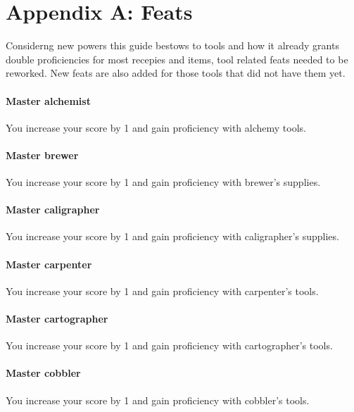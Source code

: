 \chapter*{Appendix A: Feats}

Considerng new powers this guide bestows to tools and how it already grants double proficiencies for most recepies and items, tool related feats needed to be reworked. New feats are also added for those tools that did not have them yet.

\subsubsection{Master alchemist}

You increase your \intelligence{} score by 1 and gain proficiency with alchemy tools.

\subsubsection{Master brewer}

You increase your \wisdom{} score by 1 and gain proficiency with brewer's supplies.

\subsubsection{Master caligrapher}

You increase your \intelligence{} score by 1 and gain proficiency with caligrapher's supplies.

\subsubsection{Master carpenter}

You increase your \strength{} score by 1 and gain proficiency with carpenter's tools.

\subsubsection{Master cartographer}

You increase your \intelligence{} score by 1 and gain proficiency with cartographer's tools.

\subsubsection{Master cobbler}

You increase your \strength{} score by 1 and gain proficiency with cobbler's tools.

